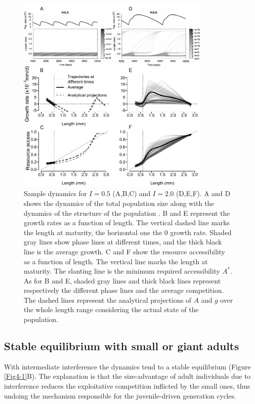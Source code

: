 \begin{figure}[!ht] %
\centering
\includegraphics[width=0.85\textwidth]{4_ChapThe1/Fig/Fig2.pdf} 
\caption[Sample dynamics for $I=0.5$ and
$I=2.0$]{Sample dynamics for $I=0.5$ (A,B,C) and $I=2.0$ (D,E,F). A and D shows the dynamics of
the total population size along with the dynamics of the structure of the
population \autocites{mallard2012a}. B and E represent the growth rates as a
function of length. The vertical dashed line marks the length at maturity, the
horizontal one the $0$ growth rate. Shaded gray lines show phase lines at
different times, and the thick black line is the average growth. C and F show
the resource accessibility as a function of length. The vertical line marks the
length at maturity. The slanting line is the minimum required accessibility
$A^*$. As for B and E, shaded gray lines and thick black lines represent
respectively the different phase lines and the average competition. The dashed
lines represent the analytical projections of $A$ and $g$ over the whole length
range considering the actual state of the population.}
\label{Fig4-2}
\end{figure}

\subsection{Stable equilibrium with small or giant adults}

With intermediate interference the dynamics tend to a stable equilibrium (Figure
\ref{Fig4-1}B). The explanation is that the size-advantage of adult individuals
due to interference reduces the exploitative competition inflicted by the small
ones, thus undoing the mechanism responsible for the juvenile-driven generation
cycles.

